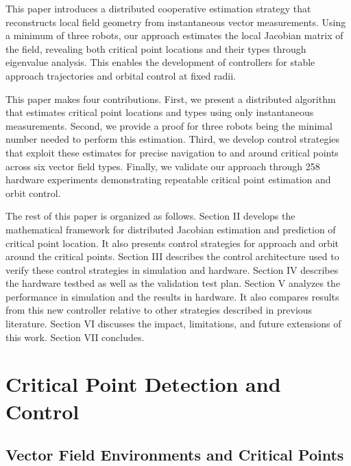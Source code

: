\documentclass[lettersize,journal]{IEEEtran}
\begin{document}
This paper introduces a distributed cooperative estimation strategy that reconstructs local field geometry from instantaneous vector measurements. Using a minimum of three robots, our approach estimates the local Jacobian matrix of the field, revealing both critical point locations and their types through eigenvalue analysis. This enables the development of controllers for stable approach trajectories and orbital control at fixed radii.

This paper makes four contributions. First, we present a distributed algorithm that estimates critical point locations and types using only instantaneous measurements. Second, we provide a proof for three robots being the minimal number needed to perform this estimation. Third, we develop control strategies that exploit these estimates for precise navigation to and around critical points across six vector field types. Finally, we validate our approach through 258 hardware experiments demonstrating repeatable critical point estimation and orbit control.

The rest of this paper is organized as follows. Section II develops the mathematical framework for distributed Jacobian estimation and prediction of critical point location. It also presents control strategies for approach and orbit around the critical points. Section III describes the control architecture used to verify these control strategies in simulation and hardware. Section IV describes the hardware testbed as well as the validation test plan. Section V analyzes the performance in simulation and the results in hardware. It also compares results from this new controller relative to other strategies described in previous literature. Section VI discusses the impact, limitations, and future extensions of this work. Section VII concludes.





\section{Critical Point Detection and Control}


\subsection{Vector Field Environments and Critical Points}
\end{document}
